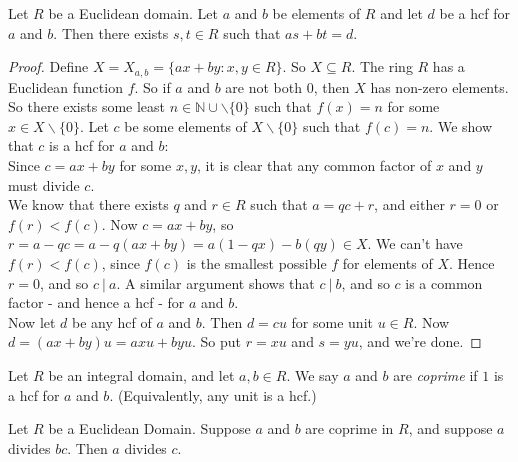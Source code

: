  \begin{lemma}   Let $R$ be a Euclidean domain. Let $a$ and $b$ be elements of $R$ and let $d$ be a hcf for $a$ and $b$. Then there exists $s,t\in R$ such that $as + bt = d$.	
 \end{lemma}

 
 \begin{proof}
 	Define $X = X_{a,b} = \{ax + by : x,y \in R\}$. So $X \subseteq R$. The ring $R$ has a Euclidean function $f$. So if $a$ and $b$ are not both $0$, then $X$ has non-zero elements. So there exists some least $n \in \mathbb{N}\cup\backslash\{0\}$ such that $f(x) = n$ for some $x \in X\backslash\{0\}.$ Let $c$ be some elements of $X \backslash\{0\}$ such that $f(c) = n$. We show that $c$ is a hcf for $a$ and $b$:\\
 	
 	Since $c = ax + by$ for some $x,y$, it is clear that any common factor of $x$ and $y$ must divide $c$.\\
 	
 	We know that there exists $q$ and $r\in R$ such that $a = qc + r$, and either $ r = 0$ or $f(r) < f(c)$. Now $c = ax + by$, so $r = a -qc = a - q(ax + by) = a(1-qx) -b(qy) \in X$. We can't have $f(r) < f(c)$, since $f(c)$ is the smallest possible $f$ for elements of $X$. Hence $r = 0$, and so $c~|~ a$. A similar argument shows that $c ~|~ b$, and so $c$ is a common factor - and hence a hcf - for $a$ and $b$.\\
 	
 	Now let $d$ be any hcf of $a$ and $b$. Then $d =  cu$ for some unit $u \in R$. Now $d = (ax + by)u = axu + byu$. So put $r = xu$ and $s = yu$, and we're done.
 \end{proof}\vspace*{10pt}
 
 
 
 
 
\begin{definition}Let $R$ be an integral domain, and let $a,b \in R$. We say $a$ and $b$ are \emph{coprime}  if $1$ is a hcf for $a$ and $b$. (Equivalently, any unit is a hcf.)	
\end{definition}\vspace*{5pt}
 
 \begin{proposition} Let $R$ be a Euclidean Domain. Suppose $a$ and $b$ are coprime in $R$, and suppose $a$ divides $bc$. Then $a$ divides $c$.
\end{proposition}

